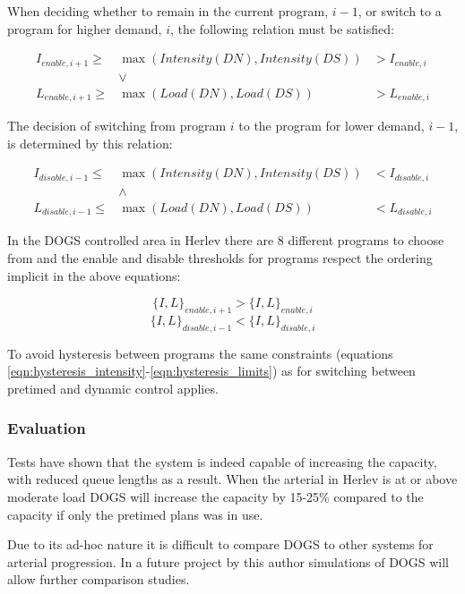 When deciding whether to remain in the current program, $i-1$, or switch to a program for higher demand, $i$, the following relation must be satisfied:

\begin{eqnarray*}
I_{enable,i+1} \geq & \max(Intensity(DN),Intensity(DS)) & > I_{enable,i} \\
& \vee & \\
L_{enable,i+1} \geq & \max(Load(DN),Load(DS))  & > L_{enable,i}
\end{eqnarray*}

The decision of switching from program $i$ to the program for lower demand, $i-1$, is determined by this relation:

\begin{eqnarray*}
I_{disable,i-1} \leq & \max(Intensity(DN),Intensity(DS)) & < I_{disable,i} \\
& \wedge & \\
L_{disable,i-1} \leq & \max(Load(DN),Load(DS))  & < L_{disable,i}
\end{eqnarray*}

In the DOGS controlled area in Herlev there are 8 different programs to choose from and the enable and disable thresholds for programs respect the ordering implicit in the above equations:

$$\lbrace I,L \rbrace_{enable,i+1} > \lbrace I,L \rbrace_{enable,i}$$
$$\lbrace I,L \rbrace_{disable,i-1} < \lbrace I,L \rbrace_{disable,i}$$

To avoid hysteresis between programs the same constraints (equations \ref{eqn:hysteresis_intensity}-\ref{eqn:hysteresis_limits}) as for switching between pretimed and dynamic control applies.

\subsubsection*{Evaluation}
Tests have shown that the system is indeed capable of increasing the capacity, with reduced queue lengths as a result. When the arterial in Herlev is at or above moderate load DOGS will increase the capacity by 15-25\% compared to the capacity if only the pretimed plans was in use.

Due to its ad-hoc nature it is difficult to compare DOGS to other systems for arterial progression. In a future project by this author simulations of DOGS will allow further comparison studies.